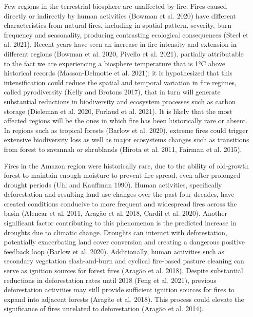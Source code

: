 \documentclass[
]{article}
\begin{document}
Few regions in the terrestrial biosphere are unaffected by fire. Fires
caused directly or indirectly by human activities (Bowman et al. 2020)
have different characteristics from natural fires, including in spatial
pattern, severity, burn frequency and seasonality, producing contrasting
ecological consequences (Steel et al. 2021). Recent years have seen an
increase in fire intensity and extension in different regions (Bowman et
al. 2020, Pivello et al. 2021), partially attributable to the fact we
are experiencing a biosphere temperature that is 1°C above historical
records (Masson-Delmotte et al. 2021); it is hypothesized that this
intensification could reduce the spatial and temporal variation in fire
regimes, called pyrodiversity (Kelly and Brotons 2017), that in turn
will generate substantial reductions in biodiversity and ecosystem
processes such as carbon storage (Dieleman et al. 2020, Furlaud et al.
2021). It is likely that the most affected regions will be the ones in
which fire has been historically rare or absent. In regions such as
tropical forests (Barlow et al. 2020), extreme fires could trigger
extensive biodiversity loss as well as major ecosystems changes such as
transitions from forest to savannah or shrublands (Hirota et al. 2011,
Fairman et al. 2015).

Fires in the Amazon region were historically rare, due to the ability of
old-growth forest to maintain enough moisture to prevent fire spread,
even after prolonged drought periods (Uhl and Kauffman 1990). Human
activities, specifically deforestation and resulting land-use changes
over the past four decades, have created conditions conducive to more
frequent and widespread fires across the basin (Alencar et al. 2011,
Aragão et al. 2018, Cardil et al. 2020). Another significant factor
contributing to this phenomenon is the predicted increase in droughts
due to climatic change. Droughts can interact with deforestation,
potentially exacerbating land cover conversion and creating a dangerous
positive feedback loop (Barlow et al. 2020). Additionally, human
activities such as secondary vegetation slash-and-burn and cyclical
fire-based pasture cleaning can serve as ignition sources for forest
fires (Aragão et al. 2018). Despite substantial reductions in
deforestation rates until 2018 (Feng et al. 2021), previous
deforestation activities may still provide sufficient ignition sources
for fires to expand into adjacent forests (Aragão et al. 2018). This
process could elevate the significance of fires unrelated to
deforestation (Aragão et al. 2014).
\end{document}

